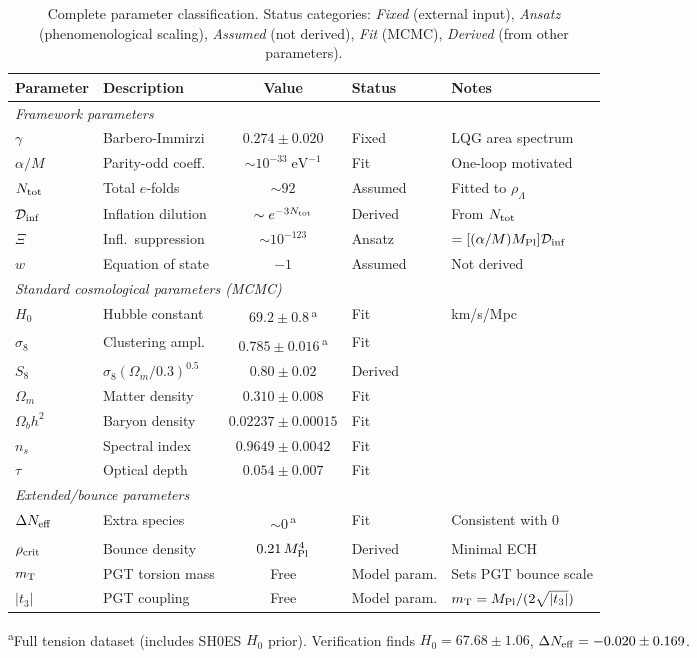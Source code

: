 \documentclass[aps,prd,twocolumn,superscriptaddress,showpacs,preprintnumbers,
  nofootinbib,longbibliography,floatfix]{revtex4-2}
\newcommand{\Dinf}{\mathcal{D}_{\rm inf}}
\newcommand{\rhocrit}{\rho_{\rm crit}}
\newcommand{\MPl}{M_{\rm Pl}}
\newcommand{\Neff}{N_{\rm eff}}
\newcommand{\BI}{\gamma}
\newcommand{\mT}{m_{\rm T}}
\begin{document}
\begin{table}[t]
\caption{\label{tab:params} Complete parameter classification. Status
categories: \textit{Fixed} (external input), \textit{Ansatz}
(phenomenological scaling), \textit{Assumed} (not derived),
\textit{Fit} (MCMC), \textit{Derived} (from other parameters).}
\begin{ruledtabular}
\begin{tabular}{llcll}
\textbf{Parameter} & \textbf{Description} & \textbf{Value}
  & \textbf{Status} & \textbf{Notes} \\
\hline
\multicolumn{5}{l}{\textit{Framework parameters}} \\
$\BI$ & Barbero-Immirzi & $0.274 \pm 0.020$ & Fixed & LQG area spectrum \\
$\alpha/M$ & Parity-odd coeff. & $\sim 10^{-33}\;\text{eV}^{-1}$
  & Fit & One-loop motivated \\
$N_{\rm tot}$ & Total $e$-folds & $\sim 92$ & Assumed
  & Fitted to $\rho_\Lambda$ \\
$\Dinf$ & Inflation dilution & $\sim e^{-3N_{\rm tot}}$
  & Derived & From $N_{\rm tot}$ \\
$\Xi$ & Infl.\ suppression & $\sim 10^{-123}$
  & Ansatz & $=[(\alpha/M)\MPl]\Dinf$ \\
$w$ & Equation of state & $-1$ & Assumed & Not derived \\
\hline
\multicolumn{5}{l}{\textit{Standard cosmological parameters (MCMC)}} \\
$H_0$ & Hubble constant & $69.2\pm 0.8$\,\textsuperscript{a}
  & Fit & km/s/Mpc \\
$\sigma_8$ & Clustering ampl. & $0.785\pm 0.016$\,\textsuperscript{a}
  & Fit & \\
$S_8$ & $\sigma_8(\Omega_m/0.3)^{0.5}$ & $0.80\pm 0.02$
  & Derived & \\
$\Omega_m$ & Matter density & $0.310 \pm 0.008$ & Fit & \\
$\Omega_b h^2$ & Baryon density & $0.02237 \pm 0.00015$ & Fit & \\
$n_s$ & Spectral index & $0.9649 \pm 0.0042$ & Fit & \\
$\tau$ & Optical depth & $0.054 \pm 0.007$ & Fit & \\
\hline
\multicolumn{5}{l}{\textit{Extended/bounce parameters}} \\
$\Delta\Neff$ & Extra species & $\sim 0$\,\textsuperscript{a}
  & Fit & Consistent with 0 \\
$\rhocrit$ & Bounce density & $0.21\,\MPl^4$ & Derived & Minimal ECH \\
$\mT$ & PGT torsion mass & Free & Model param. & Sets PGT bounce scale \\
$|t_3|$ & PGT coupling & Free & Model param. & $\mT = \MPl/(2\sqrt{|t_3|})$ \\
\end{tabular}
\end{ruledtabular}
\textsuperscript{a}Full tension dataset (includes SH0ES $H_0$ prior).
Verification finds $H_0 = 67.68 \pm 1.06$, $\Delta\Neff = -0.020
\pm 0.169$.
\end{table}
\end{document}
